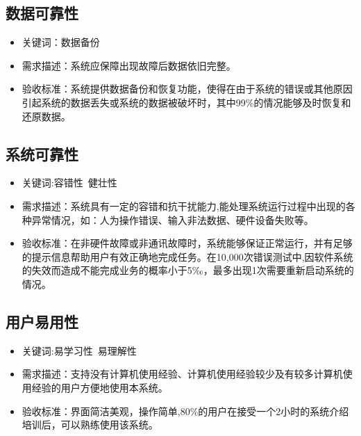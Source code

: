 \documentclass[hyperref, a4paper]{ctexart}
\providecommand{\tightlist}{%
  \setlength{\itemsep}{0pt}\setlength{\parskip}{0pt}}
\begin{document}
\hypertarget{ux6570ux636eux53efux9760ux6027}{%
\subsection{数据可靠性}\label{ux6570ux636eux53efux9760ux6027}}

\begin{itemize}
\tightlist
\item
  关键词：数据备份
\item
  需求描述：系统应保障出现故障后数据依旧完整。
\item
  验收标准：系统提供数据备份和恢复功能，使得在由于系统的错误或其他原因引起系统的数据丢失或系统的数据被破坏时，其中99\%的情况能够及时恢复和还原数据。
\end{itemize}

\hypertarget{ux7cfbux7edfux53efux9760ux6027}{%
\subsection{系统可靠性}\label{ux7cfbux7edfux53efux9760ux6027}}

\begin{itemize}
\tightlist
\item
  关键词:容错性~健壮性
\item
  需求描述：系统具有一定的容错和抗干扰能力,能处理系统运行过程中出现的各种异常情况，如：人为操作错误、输入非法数据、硬件设备失败等。
\item
  验收标准：在非硬件故障或非通讯故障时，系统能够保证正常运行，并有足够的提示信息帮助用户有效正确地完成任务。在10,000次错误测试中,因软件系统的失效而造成不能完成业务的概率小于5‰，最多出现1次需要重新启动系统的情况。
\end{itemize}

\hypertarget{ux7528ux6237ux6613ux7528ux6027}{%
\subsection{用户易用性}\label{ux7528ux6237ux6613ux7528ux6027}}

\begin{itemize}
\tightlist
\item
  关键词:易学习性~易理解性
\item
  需求描述：支持没有计算机使用经验、计算机使用经验较少及有较多计算机使用经验的用户方便地使用本系统。
\item
  验收标准：界面简洁美观，操作简单,80\%的用户在接受一个2小时的系统介绍培训后，可以熟练使用该系统。
\end{itemize}
\end{document}
